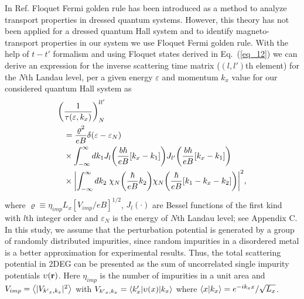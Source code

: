 
In Ref. \cite{wackerl20} Floquet Fermi golden rule has been introduced as a method to analyze transport properties in dressed quantum systems. However, this theory has not been applied for a dressed quantum Hall system and to identify magneto-transport properties in our system we use Floquet Fermi golden rule.
With the help of $t-t'$ formalism \cite{wackerl20,grifoni98,sambe75,peskin93,althorpe97} and using Floquet states derived in Eq.~(\ref{eq_12}) we can derive an  expression for the inverse scattering time matrix ($(l,l')$th element) for the $N$th Landau level, per a given energy $\varepsilon$ and momentum $k_x$ value for our considered quantum Hall system as
\begin{equation} \label{eq_13}
  \begin{aligned}
    \bigg(&\frac{1}{\tau(\varepsilon,k_x)}\bigg)^{ll'}_{N} \\
    & =
    \frac { \varrho^2}{eB}
    \delta(\varepsilon - \varepsilon_{N}) \\
    & \times
    \int_{-\infty}^{\infty} d k_1
    J_l\qty(\frac{b\hbar}{eB}[{k}_x - k_1])
    J_{l'}\qty(\frac{b\hbar}{eB}[{k}_x - k_1]) \\
    & \times
    \qty|
    \int_{-\infty}^{\infty} dk_2 \;
    {\chi}_{N}\qty(\frac{\hbar}{eB}k_2)
    {\chi}_{N}\qty(\frac{\hbar}{eB} \qty[k_1 - {k}_x - k_2])|^2,
  \end{aligned}
\end{equation}
where $\varrho \equiv \eta_{imp} L_x [ { V_{imp}}/{eB}]^{1/2}$,
$J_l(\cdot)$ are Bessel functions of the first kind with $l$th integer order and $\varepsilon_N$ is the energy of $N$th Landau level; see Appendix C. In this study, we assume that the perturbation potential is generated by a group of randomly distributed impurities, since random impurities in a disordered metal is a better approximation for experimental results. Thus, the total scattering potential in 2DEG can be presented as the sum of uncorrelated single impurity potentials $\upsilon(\vb{r})$. Here $\eta_{imp}$ is the number of impurities in a unit area and $V_{imp} = \expval{|V_{{k'}_x,k_x}|^2}$ with $V_{{k'}_x,k_x} = \mel**{k'_x}{\upsilon(x) }{k_x}$ where $\braket{x}{k_x} = e^{-ik_x x}/\sqrt{L_x}$.

